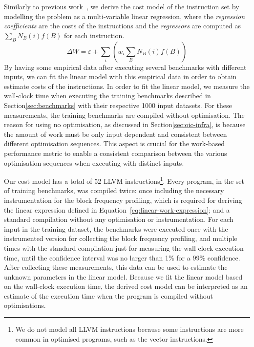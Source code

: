 \documentclass[sigplan,10pt]{acmart}
\theoremstyle{definition}
\begin{document}
Similarly to previous work~\citep{giusto01,powell09,brandolese11}, we derive the cost model of the instruction set by modelling the problem as a multi-variable linear regression, where the \textit{regression coefficients} are the costs of the instructions and the \textit{regressors} are computed as $\sum_B N_B(i)f(B)$ for each instruction.
\begin{equation}\label{eq:linear-work-expression}
\Delta W = \varepsilon + \sum_{i} \left(w_i \sum_{B} N_B(i)f(B)\right)
\end{equation}
By having some empirical data after executing several benchmarks with different inputs, we can fit the linear model with this empirical data in order to obtain estimate costs of the instructions.
In order to fit the linear model, we measure the wall-clock time when executing the training benchmarks described in Section\ref{sec:benchmarks} with their respective 1000 input datasets.
For these measurements, the training benchmarks are compiled without optimisation.
The reason for using no optimisation, as discussed in Section\ref{sec:oic-infra}, is because the amount of work must be only input dependent and consistent between different optimisation sequences.
This aspect is crucial for the work-based performance metric to enable a consistent comparison between the various optimisation sequences when executing with distinct inputs.

Our cost model has a total of 52 LLVM instructions\footnote{We do not model all LLVM instructions because some instructions are more common in optimised programs, such as the vector instructions.}.
Every program, in the set of training benchmarks, was compiled twice: once including the necessary instrumentation for the block frequency profiling, which is required for deriving the linear expression defined in Equation~\ref{eq:linear-work-expression};
and a standard compilation without any optimisation or instrumentation.
For each input in the training dataset, the benchmarks were executed once with the instrumented version for collecting the block frequency profiling, and multiple times with the standard compilation just for measuring the wall-clock execution time, until the confidence interval was no larger than 1\% for a 99\% confidence.
After collecting these measurements, this data can be used to estimate the unknown parameters in the linear model.
Because we fit the linear model based on the wall-clock execution time, the derived cost model can be interpreted as an estimate of the execution time when the program is compiled without optimisations.
\end{document}
